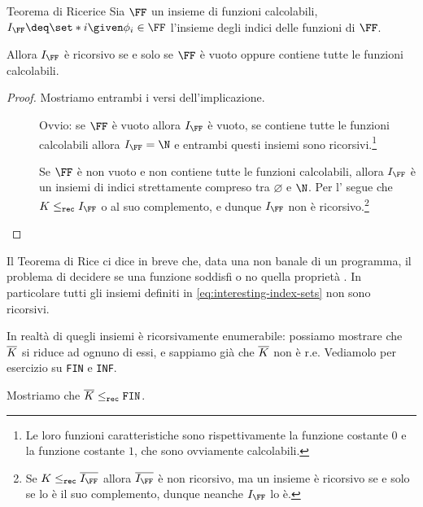 \begin{theorem}
    {Teorema di Rice}{rice}
    Sia $\FF$ un insieme di funzioni calcolabili, $I_\FF \deq \set*{i \given \phi_i \in \FF}$ l'insieme degli indici delle funzioni di $\FF$.
    
    Allora $I_\FF$ è ricorsivo se e solo se $\FF$ è vuoto oppure contiene tutte le funzioni calcolabili. 
\end{theorem}
\begin{proof}
    Mostriamo entrambi i versi dell'implicazione.

    \begin{description}
        \item[\boximplby] Ovvio: se $\FF$ è vuoto allora $I_\FF$ è vuoto, se contiene tutte le funzioni calcolabili allora $I_\FF = \N$ e entrambi questi insiemi sono ricorsivi.\footnote{Le loro funzioni caratteristiche sono rispettivamente la funzione costante $0$ e la funzione costante $1$, che sono ovviamente calcolabili.}
        \item[\boximpl] Se $\FF$ è non vuoto e non contiene tutte le funzioni calcolabili, allora $I_\FF$ è un insiemi di indici strettamente compreso tra $\varnothing$ e $\N$. Per l' segue che $K \leq_\rec I_\FF$ o al suo complemento, e dunque $I_\FF$ non è ricorsivo.\footnote{Se $K \leq_\rec \compl{I_\FF}$ allora $\compl{I_\FF}$ è non ricorsivo, ma un insieme è ricorsivo se e solo se lo è il suo complemento, dunque neanche $I_\FF$ lo è.}   
    \end{description}
\end{proof}

Il Teorema di Rice ci dice in breve che, data una  non banale di un programma, il problema di decidere se una funzione soddisfi o no quella proprietà . In particolare tutti gli insiemi definiti in \eqref{eq:interesting-index-sets} non sono ricorsivi.

In realtà  di quegli insiemi è ricorsivamente enumerabile: possiamo mostrare che $\overline{K}$ si riduce ad ognuno di essi, e sappiamo già che $\overline{K}$ non è r.e. Vediamolo per esercizio su \texttt{FIN} e \texttt{INF}.

Mostriamo che $\overline{K} \leq_{\texttt{rec}} \texttt{FIN}$.

